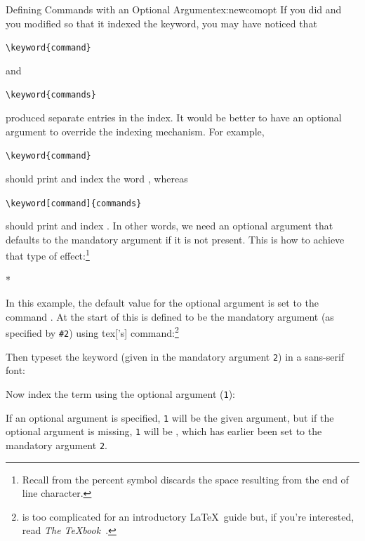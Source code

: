 \begin{exercise}{Defining Commands with an Optional Argument}{ex:newcomopt}
If you did  and you modified 
so that it indexed the keyword, you may have noticed that
\begin{codeS}
\verb|\keyword{command}|
\end{codeS}
and
\begin{codeS}
\verb|\keyword{commands}|
\end{codeS}
produced separate entries in the index. It would be better to have an
optional argument to override the indexing mechanism. For example,
\begin{codeS}
\verb|\keyword{command}|
\end{codeS}
should print and index the word ,
whereas
\begin{codeS}
\verb|\keyword[command]{commands}|
\end{codeS}
should print 
and index . In other words, we need an optional
argument that defaults to the mandatory argument if it is not
present.
This is how to achieve that type of effect:\footnote{Recall from  the percent symbol discards the space resulting from the end
of line character.}
\begin{code}
*
\end{code}
In this example, the default value for the optional argument
is set to the command . At the start of 
 this is defined to be the mandatory argument 
(as specified by \verb|#2|) using \gls{tex}['s] 
command:\footnote{ is too complicated for an
introductory \LaTeX\ guide but, if you're interested, read \emph{The
\TeX{}book}~\cite{texbook}.}
\begin{alltt}
\end{alltt}
Then typeset the keyword (given in the mandatory
argument \texttt{2}) in a sans-serif font:
\begin{alltt}
\end{alltt}
Now index the term using the optional argument (\texttt{1}):
\begin{alltt}
\end{alltt}
If an optional argument is specified, \texttt{1} will be the given
argument, but if the optional argument is missing, \texttt{1} will
be , which has earlier been set to
the mandatory argument \texttt{2}.
\end{exercise}

